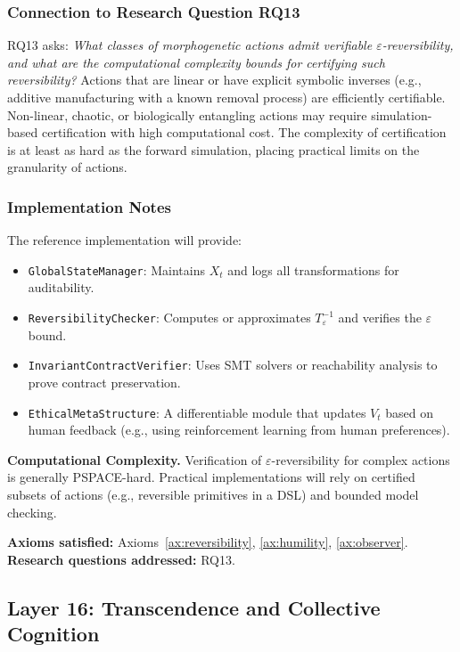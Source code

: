 \subsubsection{Connection to Research Question RQ13}
RQ13 asks: \emph{What classes of morphogenetic actions admit verifiable $\varepsilon$-reversibility, and what are the computational complexity bounds for certifying such reversibility?} Actions that are linear or have explicit symbolic inverses (e.g., additive manufacturing with a known removal process) are efficiently certifiable. Non-linear, chaotic, or biologically entangling actions may require simulation-based certification with high computational cost. The complexity of certification is at least as hard as the forward simulation, placing practical limits on the granularity of actions.

\subsubsection{Implementation Notes}
The reference implementation will provide:
\begin{itemize}
    \item \texttt{GlobalStateManager}: Maintains $X_t$ and logs all transformations for auditability.
    \item \texttt{ReversibilityChecker}: Computes or approximates $T^{-1}_\varepsilon$ and verifies the $\varepsilon$ bound.
    \item \texttt{InvariantContractVerifier}: Uses SMT solvers or reachability analysis to prove contract preservation.
    \item \texttt{EthicalMetaStructure}: A differentiable module that updates $V_t$ based on human feedback (e.g., using reinforcement learning from human preferences).
\end{itemize}

\textbf{Computational Complexity.} Verification of $\varepsilon$-reversibility for complex actions is generally PSPACE-hard. Practical implementations will rely on certified subsets of actions (e.g., reversible primitives in a DSL) and bounded model checking.

\textbf{Axioms satisfied:} Axioms~\ref{ax:reversibility}, \ref{ax:humility}, \ref{ax:observer}. \\
\textbf{Research questions addressed:} RQ13.

\subsection{Layer 16: Transcendence and Collective Cognition}
\label{subsec:layer16}

